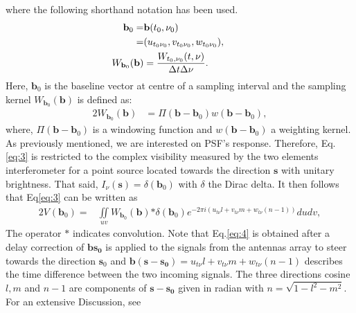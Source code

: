 where the following shorthand notation has been used.
\begin{alignat*}{2}
\hspace{-1cm}\mathbf{b}_0=&\mathbf{b}(t_0,\nu_0)\\
			 =&(u_{t_0\nu_0}, v_{t_0\nu_0}, w_{t_0\nu_0}),\\
\hspace{-1cm}W_{\mathbf{b}_0}(\mathbf{b})&=\frac{W_{t_0,\nu_0}(t,\nu)}{\Delta t \Delta \nu}.
\end{alignat*}
 Here, $\mathbf{b}_0$ is the baseline vector at centre
of a sampling interval and the sampling kernel $W_{\mathbf{b}_0}(\mathbf{b})$ is defined as:
\begin{alignat}{2}
W_{\mathbf{b}_0}(\mathbf{b})&=\Pi(\mathbf{b}-\mathbf{b}_0)w(\mathbf{b}-\mathbf{b}_0),
\end{alignat}
where, $\Pi(\mathbf{b}-\mathbf{b}_0)$ is a windowing function and $w(\mathbf{b}-\mathbf{b}_0)$ a weighting kernel.\\

As previously mentioned, we are interested on PSF's response. Therefore, Eq.\ref{eq:3} is restricted to the
complex visibility measured by the two elements interferometer for a point source located towards the direction 
$\mathbf{s}$ with unitary brightness. That said, $I_{\nu}(\mathbf{s})=\delta(\mathbf{b}_0)$ with $\delta$ the Dirac delta. 
It then follows that Eq\ref{eq:3} can be written as
\begin{alignat}{2}
V_{}(\mathbf{b}_0)  =& \iint\limits_{uv}W_{\mathbf{b}_0}(\mathbf{b})\mathbf{*}\delta(\mathbf{b}_0) e^{-2\pi i (u_{t\nu}l+v_{t\nu}m+w_{t\nu}(n-1))}du dv, \label{eq:4}
\end{alignat} 
The operator $*$ indicates convolution. Note that Eq.\ref{eq:4} is obtained after a
delay correction of $\mathbf{b}\mathbf{s_0}$ is  applied to the signals from the antennas 
array to steer towards the direction $\mathbf{s}_0$ and $\mathbf{b}(\mathbf{s}-\mathbf{s_0})=u_{t\nu}l + v_{t\nu}m + w_{t\nu}(n-1)$
describes the time difference between the two incoming signals. The three directions cosine $l,m$ and $n-1$ 
are  components of  $\mathbf{s}-\mathbf{s_0}$ given in radian with $n=\sqrt{1-l^2-m^2}$. For an extensive Discussion, see \citep{thompson2008interferometry,taylor1999synthesis}\\

